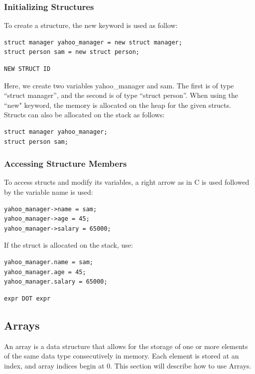 \documentclass{article}
\begin{document}
\subsubsection{Initializing Structures}
To create a structure, the new keyword is used as follow:
\begin{lstlisting}
struct manager yahoo_manager = new struct manager;
struct person sam = new struct person;
\end{lstlisting}

\begin{Verbatim}[frame=single]
NEW STRUCT ID 
\end{Verbatim}

Here, we create two variables yahoo\_manager and sam. The first is of type ``struct manager'', and the second is of type ``struct person''. When using the ``new" keyword, the memory is allocated on the heap for the given structs. Structs can also be allocated on the stack as follows:

\begin{lstlisting}
struct manager yahoo_manager;
struct person sam;
\end{lstlisting}

\subsubsection{Accessing Structure Members}

 To access structs and modify its variables, a right arrow as in C is used followed by the variable name is used:

 \begin{lstlisting}
yahoo_manager->name = sam;
yahoo_manager->age = 45;
yahoo_manager->salary = 65000;
\end{lstlisting}

If the struct is allocated on the stack, use:
 \begin{lstlisting}
yahoo_manager.name = sam;
yahoo_manager.age = 45;
yahoo_manager.salary = 65000;
\end{lstlisting}
 
 
\begin{Verbatim}[frame=single]
expr DOT expr 
\end{Verbatim}


\subsection{Arrays}
An array is a data structure that allows for the storage of one or more elements of the same data type consecutively in memory. Each element is stored at an index, and array indices begin at 0. This section will describe how to use Arrays.
\end{document}
